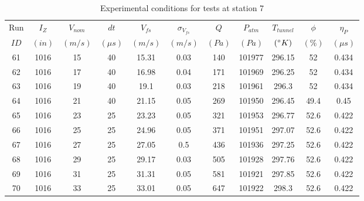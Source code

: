 \begin{table}[H]
\begin{center}
\begin{tabular}{|ccccccccccc|}
	\hline
	Run & $I_Z$ & $V_{nom}$ & $dt$ & $V_{fs}$ & $\sigma_{V_{fs}}$ & $Q$ & $P_{atm}$ & $T_{tunnel}$ & $\phi$ & $\eta_P$\\
	$ID$ & $(in)$ & $(m/s)$ & $(\mu s)$ & $(m/s)$ & $(m/s)$ & $(Pa)$ & $(Pa)$ & $(\degree K)$ & $(\%)$ & $(\mu s)$\\
	\hline
	61 & 1016 & 15 & 40 & 15.31 & 0.03 & 140 & 101977 & 296.15 & 52 & 0.434\\
	62 & 1016 & 17 & 40 & 16.98 & 0.04 & 171 & 101969 & 296.25 & 52 & 0.434\\
	63 & 1016 & 19 & 40 & 19.1 & 0.03 & 218 & 101961 & 296.3 & 52 & 0.434\\
	64 & 1016 & 21 & 40 & 21.15 & 0.05 & 269 & 101950 & 296.45 & 49.4 & 0.45\\
	65 & 1016 & 23 & 25 & 23.23 & 0.05 & 321 & 101953 & 296.77 & 52.6 & 0.422\\
	66 & 1016 & 25 & 25 & 24.96 & 0.05 & 371 & 101951 & 297.07 & 52.6 & 0.422\\
	67 & 1016 & 27 & 25 & 27.05 & 0.5 & 436 & 101936 & 297.25 & 52.6 & 0.422\\
	68 & 1016 & 29 & 25 & 29.17 & 0.03 & 505 & 101928 & 297.76 & 52.6 & 0.422\\
	69 & 1016 & 31 & 25 & 31.31 & 0.05 & 581 & 101921 & 297.85 & 52.6 & 0.422\\
	70 & 1016 & 33 & 25 & 33.01 & 0.05 & 647 & 101922 & 298.3 & 52.6 & 0.422\\
	\hline
\end{tabular}
\caption{Experimental conditions for tests at station 7}
\label{table:station_7_measurements.}
\end{center}
\end{table}
